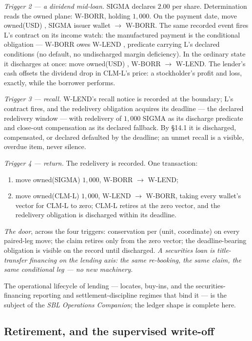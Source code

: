 \emph{Trigger 2 --- a dividend mid-loan.} SIGMA declares $2.00$ per share.
Determination reads the owned plane: W-BORR, holding $1{,}000$. On the payment
date, move owned(USD) , SIGMA issuer wallet $\to$ W-BORR. The same
recorded event fires L's contract on its income watch: the manufactured
payment is the conditional obligation --- W-BORR owes W-LEND ,
predicate carrying L's declared conditions (no default, no undischarged margin
deficiency). In the ordinary state it discharges at once: move owned(USD)
, W-BORR $\to$ W-LEND. The lender's cash offsets the dividend drop
in CLM-L's price: a stockholder's profit and loss, exactly, while the borrower
performs.

\emph{Trigger 3 --- recall.} W-LEND's recall notice is recorded at the
boundary; L's contract fires, and the redelivery obligation acquires its
deadline --- the declared redelivery window --- with redelivery of $1{,}000$
SIGMA as its discharge predicate and close-out compensation as its declared
fallback. By \S14.1 it is discharged, compensated, or declared defaulted by
the deadline; an unmet recall is a visible, overdue item, never silence.

\emph{Trigger 4 --- return.} The redelivery is recorded. One transaction:
\begin{enumerate}[label=(\arabic*),nosep]
\item move owned(SIGMA) $1{,}000$, W-BORR $\to$ W-LEND;
\item move owned(CLM-L) $1{,}000$, W-LEND $\to$ W-BORR, taking every wallet's
vector for CLM-L to zero; CLM-L retires at the zero vector, and the
redelivery obligation is discharged within its deadline.
\end{enumerate}

\emph{The door}, across the four triggers: conservation per (unit, coordinate)
on every paired-leg move; the claim retires only from the zero vector; the
deadline-bearing obligation is visible on the record until discharged.
\emph{A securities loan is title-transfer financing on the lending axis: the
same re-booking, the same claim, the same conditional leg --- no new
machinery.}

\medskip
The operational lifecycle of lending --- locates, buy-ins, and the
securities-financing reporting and settlement-discipline regimes that bind it
--- is the subject of the \emph{SBL Operations Companion}; the ledger shape is
complete here.

\subsection{Retirement, and the supervised write-off}

